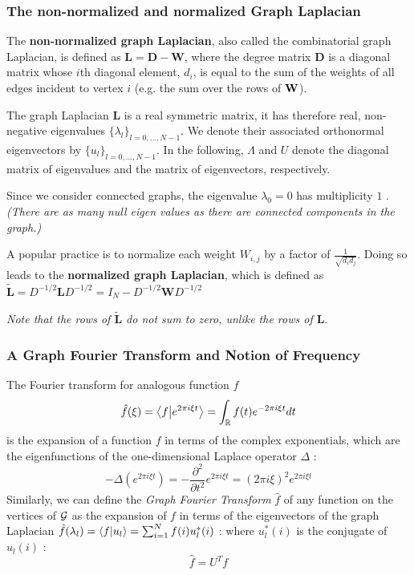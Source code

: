 \subsubsection{The non-normalized and normalized Graph Laplacian}

The \textbf{non-normalized graph Laplacian}, also called the combinatorial graph Laplacian, is defined 
as $\mathbf{L} = \mathbf{D}-\mathbf{W}$, where the degree matrix $\mathbf{D}$ 
is a diagonal matrix 
whose $i$th diagonal element, $d_i$, is equal to the sum of the weights of all edges incident to vertex $i$
(e.g. the sum over the rows of $\mathbf{W}$).

The graph Laplacian $\mathbf{L}$ is a real symmetric matrix, it has therefore real, non-negative eigenvalues $\{\lambda_l\}_{l=0, \dots, N-1}$. 
We denote their associated  orthonormal eigenvectors by $\{u_l\}_{l=0,\dots, N-1}$. In the following, $\Lambda$ and $U$ denote the diagonal matrix of eigenvalues and the matrix of eigenvectors, respectively.

Since we consider connected graphs, the eigenvalue $\lambda_0=0$ has multiplicity $1$  \cite{shuman_emerging_2013}. 
\textit{(There are as many null eigen values as there are connected components in the graph.)}

A popular practice is to normalize each weight $W_{i, j}$ by a factor of $\frac{1}{\sqrt{d_id_j}}$.
Doing so leads to the \textbf{normalized graph Laplacian}, which is defined as $\widetilde{\mathbf{L}} = D^{-1/2}\mathbf{L}D^{-1/2} = I_N - D^{-1/2}\mathbf{W}D^{-1/2}$

\textit{Note that the rows of  $\widetilde{\mathbf{L}}$ do not sum to zero, unlike the rows of $\mathbf{L}$}.


\subsubsection{A Graph Fourier Transform and Notion of Frequency}
The Fourier transform for analogous function $f$
$$
\hat{f}(\xi) = \left \langle f \middle| e^{2\pi i\xi t} \right \rangle = \int_{\mathbb{R}} f(t)e^{-2\pi i \xi t}dt
$$
is the expansion of a function $f$ in terms of the complex exponentials, which are the eigenfunctions of the one-dimensional Laplace operator $\Delta$ :
$$
-\Delta (e^{2\pi i \xi t}) = -\frac{\partial^2}{\partial t^2} e^{2\pi i \xi t} = (2\pi i\xi)^2 e^{2\pi i \xi t}
$$
Similarly, we can define the \textit{Graph Fourier Transform} $\hat{f}$ of any function on the vertices of $\mathcal{G}$ as the expansion of $f$ in terms of the eigenvectors of the graph Laplacian $\hat{f}(\lambda_l) = \left \langle f \middle| u_l \right \rangle = \sum_{i=1}^{N} f(i)u_l^*(i)$ : 
where $u_l^*(i)$ is the conjugate of $u_l(i)$ : 
\begin{equation}
    \hat{f} = U^Tf
\end{equation}

